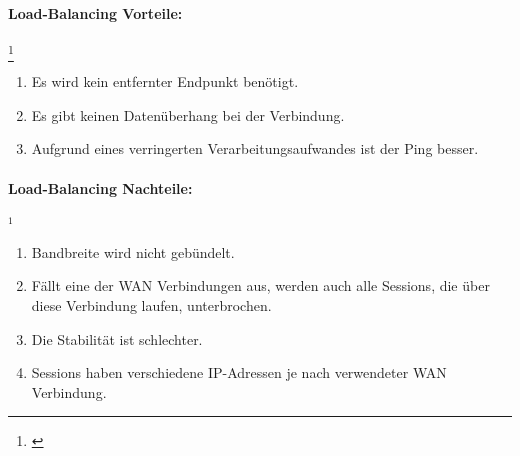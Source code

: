 \paragraph{Load-Balancing Vorteile:}\footnote[1]{\cite[Vgl.][]{MWAN3}}
\begin{enumerate}
    \item Es wird kein entfernter Endpunkt benötigt.
    \item Es gibt keinen Datenüberhang bei der Verbindung.
    \item Aufgrund eines verringerten Verarbeitungsaufwandes ist der Ping besser. 
\end{enumerate}
\paragraph{Load-Balancing Nachteile:}$^{1}$
\begin{enumerate}
    \item Bandbreite wird nicht gebündelt.
    \item Fällt eine der WAN Verbindungen aus, werden auch alle Sessions, die über diese Verbindung laufen, unterbrochen.
    \item Die Stabilität ist schlechter.
    \item Sessions haben verschiedene IP-Adressen je nach verwendeter WAN Verbindung.
\end{enumerate}


